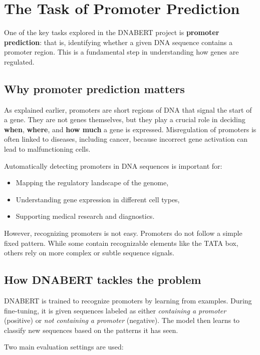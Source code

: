 \section{The Task of Promoter Prediction}

One of the key tasks explored in the DNABERT project is \textbf{promoter prediction}: that is, identifying whether a given DNA sequence contains a promoter region. This is a fundamental step in understanding how genes are regulated.

\subsection{Why promoter prediction matters}

As explained earlier, promoters are short regions of DNA that signal the start of a gene. They are not genes themselves, but they play a crucial role in deciding \textbf{when}, \textbf{where}, and \textbf{how much} a gene is expressed. Misregulation of promoters is often linked to diseases, including cancer, because incorrect gene activation can lead to malfunctioning cells.

Automatically detecting promoters in DNA sequences is important for:
\begin{itemize}
\item Mapping the regulatory landscape of the genome,
\item Understanding gene expression in different cell types,
\item Supporting medical research and diagnostics.
\end{itemize}

However, recognizing promoters is not easy. Promoters do not follow a simple fixed pattern. While some contain recognizable elements like the TATA box, others rely on more complex or subtle sequence signals.

\subsection{How DNABERT tackles the problem}

DNABERT is trained to recognize promoters by learning from examples. During fine-tuning, it is given sequences labeled as either \textit{containing a promoter} (positive) or \textit{not containing a promoter} (negative). The model then learns to classify new sequences based on the patterns it has seen.

Two main evaluation settings are used:

